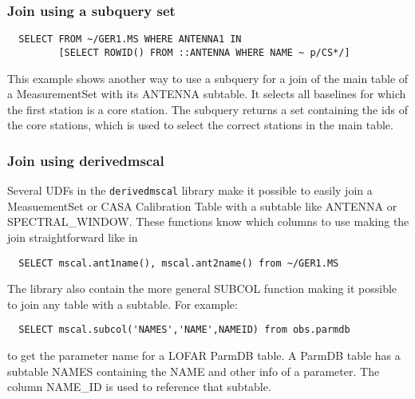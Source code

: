 \subsubsection{Join using a subquery set}
\begin{verbatim}
  SELECT FROM ~/GER1.MS WHERE ANTENNA1 IN
         [SELECT ROWID() FROM ::ANTENNA WHERE NAME ~ p/CS*/]
\end{verbatim}
This example shows another way to use a subquery for a  join of the
main table of a MeasurementSet with its ANTENNA subtable. 
It selects all baselines for which the first station is a core station.
The subquery returns a set containing the ids of the core stations,
which is used to select the correct stations in the main table.

\subsubsection{Join using derivedmscal}
Several UDFs in the \texttt{derivedmscal} library make it possible to
easily join a MeasuementSet or CASA Calibration Table with a subtable like
ANTENNA or SPECTRAL\_WINDOW. These functions know which columns to use
making the join straightforward like in
\begin{verbatim}
  SELECT mscal.ant1name(), mscal.ant2name() from ~/GER1.MS
\end{verbatim}
The library also contain the more general SUBCOL function making it
possible to join any table with a subtable. For example:
\begin{verbatim}
  SELECT mscal.subcol('NAMES','NAME',NAMEID) from obs.parmdb
\end{verbatim}
to get the parameter name for a LOFAR ParmDB table. A ParmDB table has
a subtable NAMES containing the NAME and other info of a
parameter. The column NAME\_ID is used to reference that subtable.


